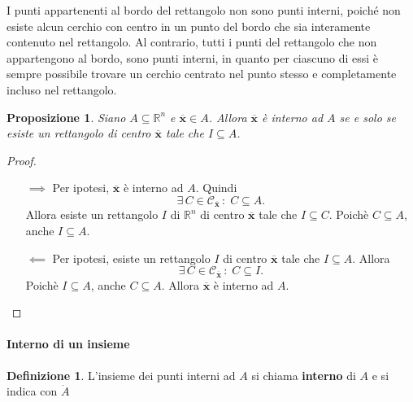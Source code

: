 \documentclass{article}
\theoremstyle{plain}
\newtheorem{prop}[thm]{Proposizione}
\theoremstyle{definition}
\newtheorem{defn}{Definizione}[section]
\theoremstyle{remark}
\begin{document}
\vspace{10pt}

I punti appartenenti al bordo del rettangolo non sono punti interni, poiché non esiste alcun cerchio con centro in un punto del bordo che sia interamente contenuto nel rettangolo. 
Al contrario, tutti i punti del rettangolo che non appartengono al bordo, sono punti interni, in quanto per ciascuno di essi è sempre possibile trovare un cerchio centrato nel punto stesso e 
completamente incluso nel rettangolo.

\vspace{10pt}

\begin{bxthm}
\begin{prop}
    Siano $A\subseteq\mathbb{R}^n$ e $\overline{\mathbf{x}}\in A$.
    Allora $\overline{\mathbf{x}}$ è interno ad $A$ se e solo se esiste un rettangolo di centro $\overline{\mathbf{x}}$ tale che $I\subseteq A$.
\end{prop}
\end{bxthm}
\begin{proof}\hfill
    \begin{itemize}
        \item[$\implies$]
        Per ipotesi, $\overline{\mathbf{x}}$ è interno ad $A$. Quindi 
        \[\exists\,C\in\mathcal{C}_{\overline{\mathbf{x}}}\,:\;C\subseteq A.\]
        Allora esiste un rettangolo $I$ di $\mathbb{R}^n$ di centro $\overline{\mathbf{x}}$ tale che $I\subseteq C$. 
        Poichè $C\subseteq A$, anche $I\subseteq A$.
        \item[$\impliedby$] 
        Per ipotesi, esiste un rettangolo $I$ di centro $\overline{\mathbf{x}}$ tale che $I\subseteq A$. 
        Allora \[\exists\,C\in\mathcal{C}_{\overline{\mathbf{x}}}\,:\;C\subseteq I.\]
        Poichè $I\subseteq A$, anche $C\subseteq A$. Allora $\overline{\mathbf{x}}$ è interno ad $A$.
    \end{itemize}
\end{proof}

\vspace{10pt}

\paragraph{Interno di un insieme}
\begin{bxthm}
\begin{defn}
    L'insieme dei punti interni ad $A$ si chiama \textbf{interno} di $A$ e si indica con $\dot{A}$ 
\end{defn}
\end{bxthm}
\end{document}
